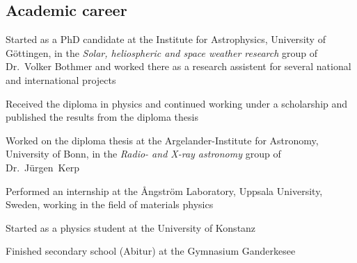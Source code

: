 \subsection*{Academic career}
\begin{description}[itemsep=3ex, leftmargin=1.5cm, style=sameline, align=parleft]
	\item[2012] Started as a PhD candidate at the Institute for Astrophysics, University of Göttingen, in the \textit{Solar, heliospheric and space weather research} group of Dr.~Volker Bothmer and worked there as a research assistent for several national and international projects
	\item[2011] Received the diploma in physics and continued working under a scholarship and published the results from the diploma thesis
	\item[2010] Worked on the diploma thesis at the Argelander-Institute for Astronomy, University of Bonn, in the \textit{Radio- and X-ray astronomy} group of Dr.~Jürgen~Kerp
	\item[2008] Performed an internship at the \AA{}ngström Laboratory, Uppsala University, Sweden, working in the field of materials physics
	\item[2004] Started as a physics student at the University of Konstanz
	\item[2003] Finished secondary school (Abitur) at the Gymnasium Ganderkesee
\end{description}

